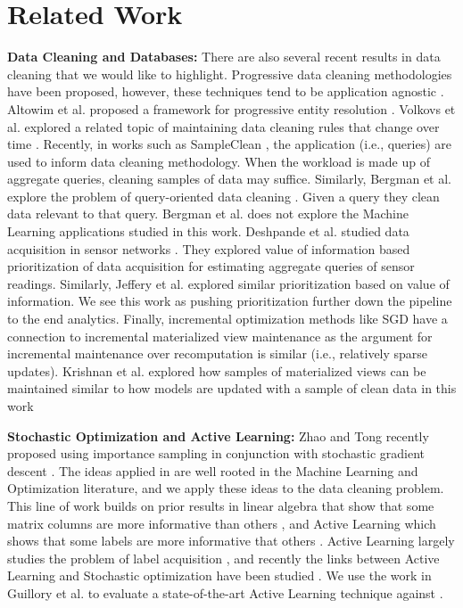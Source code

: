 \vspace{-1em}
\section{Related Work}
\noindent \textbf{Data Cleaning and Databases: } There are also several recent results in data cleaning that we would like to highlight. 
Progressive data cleaning methodologies have been proposed, however, these techniques tend to be application agnostic \cite{mayfield2010eracer}.
Altowim et al. proposed a framework for progressive entity resolution \cite{altowim2014progressive}. 
Volkovs et al. explored a related topic of maintaining data cleaning rules that change over time \cite{volkovs2014continuous}. 
Recently, in works such as SampleClean \cite{wang1999sample}, the application (i.e., queries) are used to inform data cleaning methodology.
When the workload is made up of aggregate queries, cleaning samples of data may suffice. 
Similarly, Bergman et al. explore the problem of query-oriented data cleaning \cite{DBLP:conf/sigmod/BergmanMNT15}. Given a query they clean data relevant to that query. 
Bergman et al. does not explore the Machine Learning applications studied in this work.
Deshpande et al. studied data acquisition in sensor networks \cite{deshpande2004model}. They explored value of information based prioritization of data acquisition for estimating aggregate queries of sensor readings.
Similarly, Jeffery et al. \cite{DBLP:conf/pervasive/JefferyAFHW06} explored similar prioritization based on value of information.
We see this work as pushing prioritization further down the pipeline to the end analytics.
Finally, incremental optimization methods like SGD have a connection to incremental materialized view maintenance as the argument for incremental maintenance over recomputation is similar (i.e., relatively sparse updates).
Krishnan et al. explored how samples of materialized views can be maintained similar to how models are updated with a sample of clean data in this work \cite{krishnan2015svc}

\vspace{0.5em}

\noindent \textbf{Stochastic Optimization and Active Learning: } Zhao and Tong recently proposed using importance sampling in conjunction with stochastic gradient descent \cite{zhao2014stochastic}. 
The ideas applied in \sys are well rooted in the Machine Learning and Optimization literature, and we apply these ideas to the data cleaning problem. 
This line of work builds on prior results in linear algebra that show that some matrix columns are more informative than others \cite{drineas2012fast}, and Active Learning which shows that some labels are more informative that others \cite{settles2010active}.
Active Learning largely studies the problem of label acquisition \cite{settles2010active},
and recently the links between Active Learning and Stochastic optimization have been studied \cite{guillory2009active}. 
We use the work in Guillory et al. to evaluate a state-of-the-art Active Learning technique against \sys.


